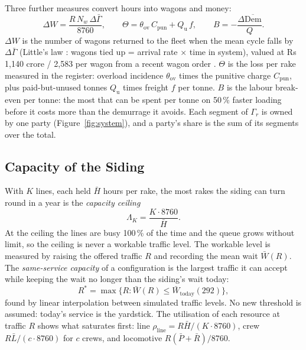 Three further measures convert hours into wagons and money:
\begin{equation}
\Delta W = \frac{R\, N_w\, \Delta\bar\Gamma}{8760}, \qquad
\Theta = \theta_{\text{ov}}\, C_{\text{pun}} + Q_{\text{u}}\, f, \qquad
B = -\frac{\Delta\overline{\mathrm{Dem}}}{Q} .
\label{eq:derived}
\end{equation}
$\Delta W$ is the number of wagons returned to the fleet when the mean cycle falls by $\Delta\bar\Gamma$ (Little's law \cite{little}: wagons tied up = arrival rate $\times$ time in system), valued at Rs 1,140 crore / 2,583 per wagon from a recent wagon order \cite{wagonvalue}. $\Theta$ is the loss per rake measured in the register: overload incidence $\theta_{\text{ov}}$ times the punitive charge $C_{\text{pun}}$, plus paid-but-unused tonnes $Q_{\text{u}}$ times freight $f$ per tonne. $B$ is the labour break-even per tonne: the most that can be spent per tonne on 50\,\% faster loading before it costs more than the demurrage it avoids. Each segment of $\Gamma_r$ is owned by one party (Figure~\ref{fig:system}), and a party's share is the sum of its segments over the total.

\subsection{Capacity of the Siding}
With $K$ lines, each held $\bar H$ hours per rake, the most rakes the siding can turn round in a year is the \emph{capacity ceiling}
\begin{equation}
\Lambda_K = \frac{K \cdot 8760}{\bar H} .
\label{eq:ceiling}
\end{equation}
At the ceiling the lines are busy 100\,\% of the time and the queue grows without limit, so the ceiling is never a workable traffic level. The workable level is measured by raising the offered traffic $R$ and recording the mean wait $\bar W(R)$. The \emph{same-service capacity} of a configuration is the largest traffic it can accept while keeping the wait no longer than the siding's wait today:
\begin{equation}
R^{*} = \max\big\{ R : \bar W(R) \le \bar W_{\text{today}}(292) \big\},
\label{eq:samesvc}
\end{equation}
found by linear interpolation between simulated traffic levels. No new threshold is assumed: today's service is the yardstick. The utilisation of each resource at traffic $R$ shows what saturates first: line $\rho_{\text{line}} = R \bar H / (K \cdot 8760)$, crew $R \bar L / (c \cdot 8760)$ for $c$ crews, and locomotive $R(\bar P + \bar R)/8760$.

